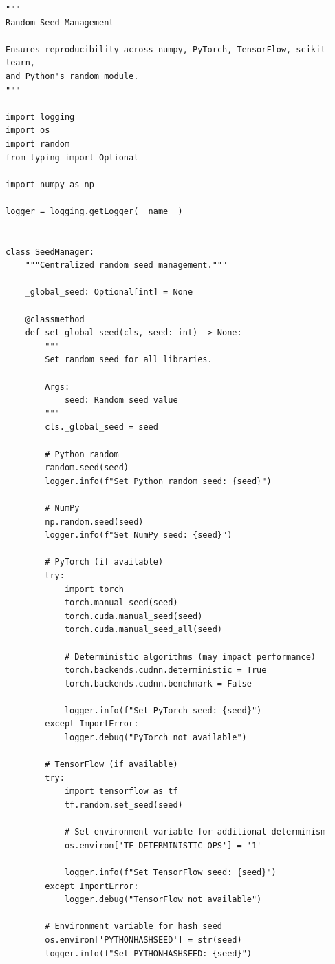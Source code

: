 \begin{lstlisting}[style=python, caption={Comprehensive random seed management}]
"""
Random Seed Management

Ensures reproducibility across numpy, PyTorch, TensorFlow, scikit-learn,
and Python's random module.
"""

import logging
import os
import random
from typing import Optional

import numpy as np

logger = logging.getLogger(__name__)


class SeedManager:
    """Centralized random seed management."""

    _global_seed: Optional[int] = None

    @classmethod
    def set_global_seed(cls, seed: int) -> None:
        """
        Set random seed for all libraries.

        Args:
            seed: Random seed value
        """
        cls._global_seed = seed

        # Python random
        random.seed(seed)
        logger.info(f"Set Python random seed: {seed}")

        # NumPy
        np.random.seed(seed)
        logger.info(f"Set NumPy seed: {seed}")

        # PyTorch (if available)
        try:
            import torch
            torch.manual_seed(seed)
            torch.cuda.manual_seed(seed)
            torch.cuda.manual_seed_all(seed)

            # Deterministic algorithms (may impact performance)
            torch.backends.cudnn.deterministic = True
            torch.backends.cudnn.benchmark = False

            logger.info(f"Set PyTorch seed: {seed}")
        except ImportError:
            logger.debug("PyTorch not available")

        # TensorFlow (if available)
        try:
            import tensorflow as tf
            tf.random.set_seed(seed)

            # Set environment variable for additional determinism
            os.environ['TF_DETERMINISTIC_OPS'] = '1'

            logger.info(f"Set TensorFlow seed: {seed}")
        except ImportError:
            logger.debug("TensorFlow not available")

        # Environment variable for hash seed
        os.environ['PYTHONHASHSEED'] = str(seed)
        logger.info(f"Set PYTHONHASHSEED: {seed}")


\end{lstlisting}
